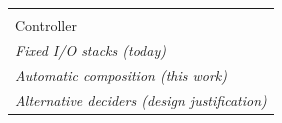 \begin{tabular}{l}
\toprule
 &  \\
Controller &  \\
\midrule
\multicolumn{1}{l}{\emph{Fixed I/O stacks (today)}} \\
\midrule
\multicolumn{1}{l}{\emph{Automatic composition (this work)}} \\
\midrule
\multicolumn{1}{l}{\emph{Alternative deciders (design justification)}} \\
\bottomrule
\end{tabular}
